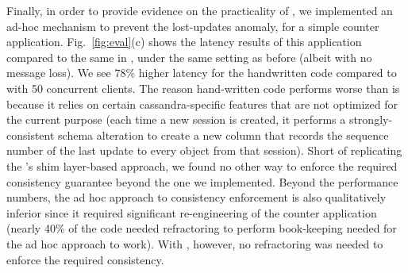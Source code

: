 Finally, in order to provide evidence on the practicality of \tool, we
implemented an ad-hoc mechanism to prevent the lost-updates anomaly,
for a simple counter application. Fig.~\ref{fig:eval}(c) shows the
latency results of this application compared to the same in \tool,
under the same setting as before (albeit with no message loss).  We
see $78\%$ higher latency for the handwritten code compared to \tool
with 50 concurrent clients. The reason hand-written code performs
worse than \tool is because it relies on certain cassandra-specific
features that are not optimized for the current purpose (each time a
new session is created, it performs a strongly-consistent schema
alteration to create a new column that records the sequence number of
the last update to every object from that session).  Short of
replicating the \tool's shim layer-based approach, we found no other
way to enforce the required consistency guarantee beyond the one we
implemented. Beyond the performance numbers, the ad hoc approach to
consistency enforcement is also qualitatively inferior since it
required significant re-engineering of the counter application (nearly
40\% of the code needed refractoring to perform book-keeping needed
for the ad hoc approach to work). With \tool, however, no refractoring
was needed to enforce the required consistency.










































